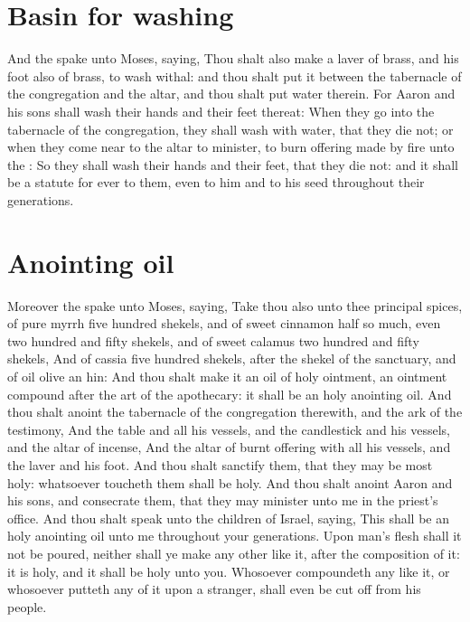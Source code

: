 \begin{biblechapter}
\section*{Basin for washing}
\verse And the \LORD spake unto Moses, saying,
\verse Thou shalt also make a laver of brass, and his foot also of brass, to wash withal: and thou shalt put it between the tabernacle of the congregation and the altar, and thou shalt put water therein.
\verse For Aaron and his sons shall wash their hands and their feet thereat:
\verse When they go into the tabernacle of the congregation, they shall wash with water, that they die not; or when they come near to the altar to minister, to burn offering made by fire unto the \LORD:
\verse So they shall wash their hands and their feet, that they die not: and it shall be a statute for ever to them, even to him and to his seed throughout their generations.
\section*{Anointing oil}
\verse Moreover the \LORD spake unto Moses, saying,
\verse Take thou also unto thee principal spices, of pure myrrh five hundred shekels, and of sweet cinnamon half so much, even two hundred and fifty shekels, and of sweet calamus two hundred and fifty shekels,
\verse And of cassia five hundred shekels, after the shekel of the sanctuary, and of oil olive an hin:
\verse And thou shalt make it an oil of holy ointment, an ointment compound after the art of the apothecary: it shall be an holy anointing oil.
\verse And thou shalt anoint the tabernacle of the congregation therewith, and the ark of the testimony,
\verse And the table and all his vessels, and the candlestick and his vessels, and the altar of incense,
\verse And the altar of burnt offering with all his vessels, and the laver and his foot.
\verse And thou shalt sanctify them, that they may be most holy: whatsoever toucheth them shall be holy.
\verse And thou shalt anoint Aaron and his sons, and consecrate them, that they may minister unto me in the priest's office.
\verse And thou shalt speak unto the children of Israel, saying, This shall be an holy anointing oil unto me throughout your generations.
\verse Upon man's flesh shall it not be poured, neither shall ye make any other like it, after the composition of it: it is holy, and it shall be holy unto you.
\verse Whosoever compoundeth any like it, or whosoever putteth any of it upon a stranger, shall even be cut off from his people.

\end{biblechapter}
